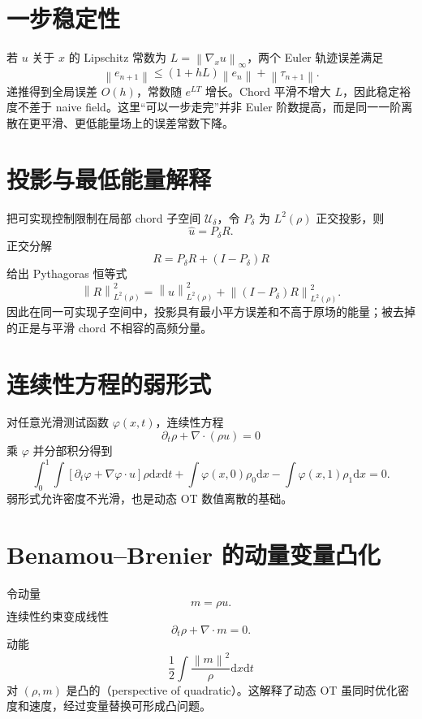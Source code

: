 \documentclass[UTF8,12pt,a4paper,fontset=none]{ctexart}
\numberwithin{equation}{section}
\newcommand{\norm}[1]{\left\lVert #1\right\rVert}
\newcommand{\dd}{\mathrm{d}}
\begin{document}
\section{一步稳定性}
若 $u$ 关于 $x$ 的 Lipschitz 常数为 $L=\norm{\nabla_xu}_\infty$，两个 Euler 轨迹误差满足
\begin{equation}
 \norm{e_{n+1}}
 \le(1+hL)\norm{e_n}+\norm{\tau_{n+1}}.
\end{equation}
递推得到全局误差 $O(h)$，常数随 $e^{LT}$ 增长。Chord 平滑不增大 $L$，因此稳定裕度不差于 naive field。这里“可以一步走完”并非 Euler 阶数提高，而是同一一阶离散在更平滑、更低能量场上的误差常数下降。

\section{投影与最低能量解释}
把可实现控制限制在局部 chord 子空间 $\mathcal U_\delta$，令 $P_\delta$ 为 $L^2(\rho)$ 正交投影，则
\begin{equation}
 \widehat u=P_\delta R.
\end{equation}
正交分解
\begin{equation}
 R=P_\delta R+(I-P_\delta)R
\end{equation}
给出 Pythagoras 恒等式
\begin{equation}
 \norm{R}_{L^2(\rho)}^2
 =\norm{\widehat u}_{L^2(\rho)}^2
 +\norm{(I-P_\delta)R}_{L^2(\rho)}^2.
\end{equation}
因此在同一可实现子空间中，投影具有最小平方误差和不高于原场的能量；被去掉的正是与平滑 chord 不相容的高频分量。

\section{连续性方程的弱形式}
对任意光滑测试函数 $\varphi(x,t)$，连续性方程
\begin{equation}
 \partial_t\rho+\nabla\cdot(\rho u)=0
\end{equation}
乘 $\varphi$ 并分部积分得到
\begin{equation}
 \int_0^1\int
 [\partial_t\varphi+\nabla\varphi\cdot u]\rho\dd x\dd t
 +\int\varphi(x,0)\rho_0\dd x
 -\int\varphi(x,1)\rho_1\dd x=0.
\end{equation}
弱形式允许密度不光滑，也是动态 OT 数值离散的基础。

\section{Benamou--Brenier 的动量变量凸化}
令动量
\begin{equation}
 m=\rho u.
\end{equation}
连续性约束变成线性
\begin{equation}
 \partial_t\rho+\nabla\cdot m=0.
\end{equation}
动能
\begin{equation}
 \frac12\int\frac{\norm m^2}{\rho}\dd x\dd t
\end{equation}
对 $(\rho,m)$ 是凸的（perspective of quadratic）。这解释了动态 OT 虽同时优化密度和速度，经过变量替换可形成凸问题。
\end{document}
